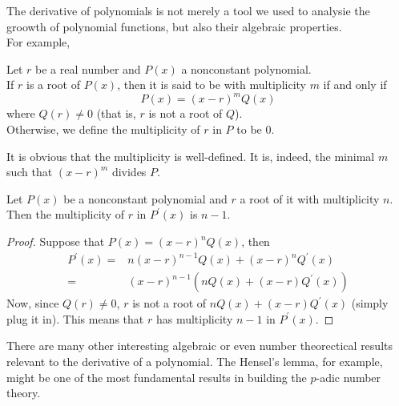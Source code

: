 The derivative of polynomials is not merely a tool we used to analysie the groowth of polynomial functions, but also their algebraic properties.\\
For example,
\begin{definition}
    Let $r$ be a real number and $P(x)$ a nonconstant polynomial.\\
    If $r$ is a root of $P(x)$, then it is said to be with multiplicity $m$ if and only if
    $$P(x)=(x-r)^mQ(x)$$
    where $Q(r)\neq 0$ (that is, $r$ is not a root of $Q$).\\
    Otherwise, we define the multiplicity of $r$ in $P$ to be $0$. 
\end{definition}
\begin{remark}
    It is obvious that the multiplicity is well-defined. It is, indeed, the minimal $m$ such that $(x-r)^m$ divides $P$.
\end{remark}
\begin{theorem}
    Let $P(x)$ be a nonconstant polynomial and $r$ a root of it with multiplicity $n$. Then the multiplicity of $r$ in $P^\prime(x)$ is $n-1$.
\end{theorem}
\begin{proof}
    Suppose that $P(x)=(x-r)^nQ(x)$, then
    \begin{align*}
        P^\prime(x)=&n(x-r)^{n-1}Q(x)+(x-r)^nQ^\prime(x)\\
        =&(x-r)^{n-1}(nQ(x)+(x-r)Q^\prime(x))
    \end{align*}
    Now, since $Q(r)\neq 0$, $r$ is not a root of $nQ(x)+(x-r)Q^\prime(x)$ (simply plug it in). This means that $r$ has multiplicity $n-1$ in $P^\prime(x)$.
\end{proof}
There are many other interesting algebraic or even number theorectical results relevant to the derivative of a polynomial.
The Hensel's lemma, for example, might be one of the most fundamental results in building the $p$-adic number theory.